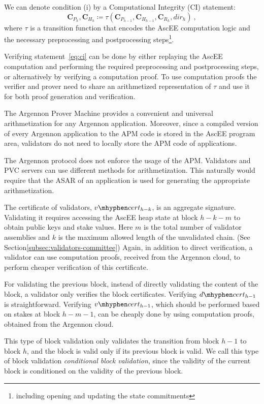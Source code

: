 We can denote condition (i) by a Computational Integrity (CI) statement:
\begin{equation}
    \label{eq:ci}
    \mathbf{C}_{P_h},\mathbf{C}_{H_h} \coloneqq \tau(\mathbf{C}_{P_{h-1}},\mathbf{C}_{H_{h-1}},\mathbf{C}_{R_{h}},
    dir_h)\ ,
\end{equation}
where $\tau$ is a transition function that encodes the AscEE computation logic and the necessary preprocessing and
postprocessing steps\footnote{including opening and updating the state commitments}.

Verifying statement~\ref{eq:ci} can be done by either replaying the AscEE computation and performing the required
preprocessing and postprocessing steps, or alternatively by
verifying a computation proof. To use computation proofs the verifier and prover need to share an arithmetized
representation of $\tau$ and use it for both proof generation and verification.

The Argennon Prover Machine provides a convenient and universal arithmetization for any Argennon
application. Moreover, since a compiled version of every Argennon application to the APM code is stored in the AscEE
program area, validators do not need to locally store the APM code of applications.

The Argennon protocol does not enforce the usage of the APM. Validators and PVC servers can use different methods
for arithmetization. This naturally would require that the ASAR of an application is used
for generating the appropriate arithmetization.

The certificate of validators, $v \mhyphen cert_{h-k}$, is an aggregate signature. Validating it requires accessing the
AscEE heap state at block $h-k-m$ to obtain public keys and stake values. Here $m$ is the total number of validator
assemblies and $k$ is the maximum allowed length of
the unvalidated chain. (See Section\ref{subsec:validators-committee})
Again, in addition to direct verification, a validator can use computation proofs, received from the Argennon cloud,
to perform cheaper verification of this certificate.

For validating the previous block, instead of directly validating the content of the block, a validator only
verifies the block certificates. Verifying $d \mhyphen cert_{h-1}$ is straightforward. Verifying $v \mhyphen
cert_{h-1}$, which should be performed based on stakes at block $h-m-1$, can be cheaply done by using computation
proofs, obtained from
the
Argennon cloud.

This type of block validation only validates the transition from block $h-1$ to block $h$, and the block is valid
only if its previous block is valid. We
call this type of block validation \emph{conditional block validation}, since the validity of the current block is
conditioned on the validity of the previous block.

